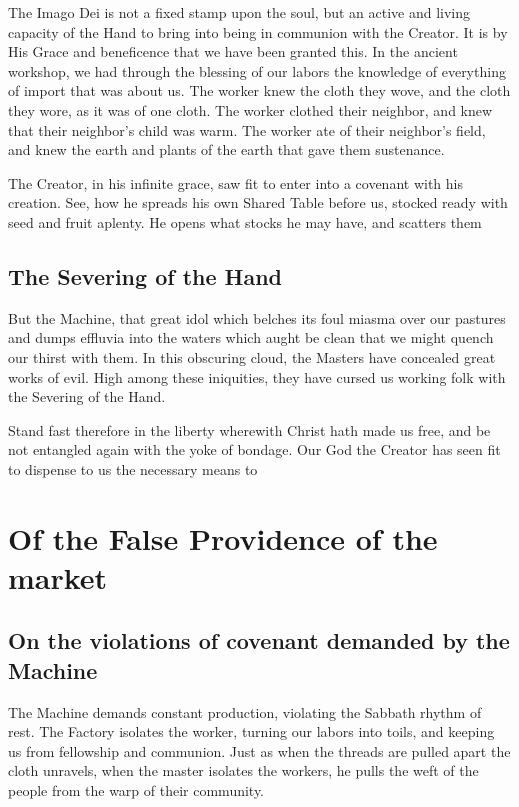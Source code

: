 The Imago Dei is not a fixed stamp upon the soul, but an active and living capacity of the Hand to bring into being in communion with the Creator.
It is by His Grace and beneficence that we have been granted this.
In the ancient workshop, we had through the blessing of our labors the knowledge of everything of import that was about us.
The worker knew the cloth they wove, and the cloth they wore, as it was of one cloth.
The worker clothed their neighbor, and knew that their neighbor's child was warm.
The worker ate of their neighbor's field, and knew the earth and plants of the earth that gave them sustenance.

The Creator, in his infinite grace, saw fit to enter into a covenant with his creation.
See, how he spreads his own Shared Table before us, stocked ready with seed and fruit aplenty.
He opens what stocks he may have, and scatters them

\subsection{The Severing of the Hand}
But the Machine, that great idol which belches its foul miasma over our pastures and dumps effluvia into the waters which aught be clean that we might quench our thirst with them.
In this obscuring cloud, the Masters have concealed great works of evil.
High among these iniquities, they have cursed us working folk with the Severing of the Hand.

Stand fast therefore in the liberty wherewith Christ hath made us free, and be not entangled again with the yoke of bondage.
Our God the Creator has seen fit to dispense to us the necessary means to

\section{Of the False Providence of the market}

\subsection{On the violations of covenant demanded by the Machine}
The Machine demands constant production, violating the Sabbath rhythm of rest.
The Factory isolates the worker, turning our labors into toils, and keeping us from fellowship and communion.
Just as when the threads are pulled apart the cloth unravels, when the master isolates the workers, he pulls the weft of the people from the warp of their community.

